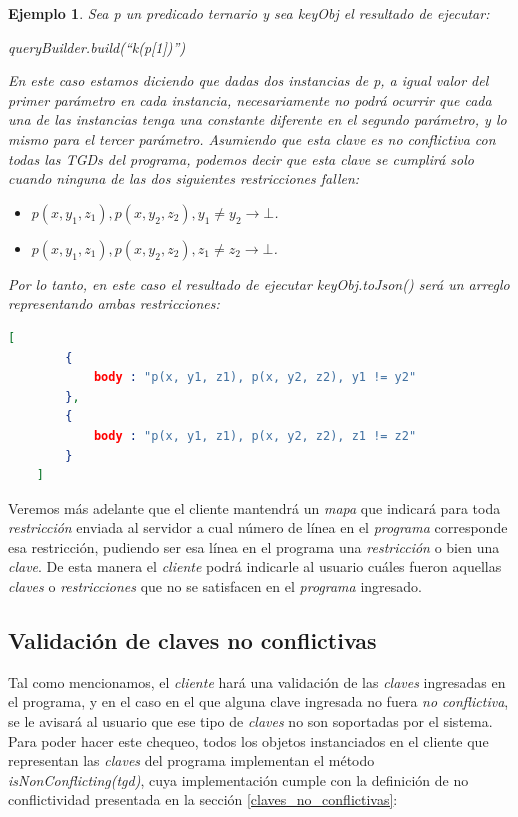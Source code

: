 \documentclass[11pt,a4paper,twoside]{tesis}
\newtheorem{exmp}{Ejemplo}
\begin{document}
\begin{exmp}
Sea \textit{p} un predicado ternario y sea \textit{keyObj} el resultado de ejecutar:

\begin{center}
   \textit{queryBuilder.build(``k(p[1])'')} 
\end{center}

En este caso estamos diciendo que dadas dos instancias de \textit{p}, a igual valor del primer parámetro en cada instancia, necesariamente no podrá ocurrir que cada una de las instancias tenga una constante diferente en el segundo parámetro, y lo mismo para el tercer parámetro. Asumiendo que esta \textit{clave} es no conflictiva con todas las \textit{TGDs} del  \textit{programa}, podemos decir que esta \textit{clave} se cumplirá solo cuando ninguna de las dos siguientes \textit{restricciones} fallen:


\begin{itemize}
    \item \textit{$p(x, y_1, z_1), p(x, y_2, z_2), y_1 \neq y_2 \rightarrow \bot$.}
    \item \textit{$p(x, y_1, z_1), p(x, y_2, z_2), z_1 \neq z_2 \rightarrow  \bot$.}
\end{itemize}

Por lo tanto, en este caso el resultado de ejecutar \textit{keyObj.toJson()} será un arreglo representando ambas \textit{restricciones}:

\begin{lstlisting}[language=json,firstnumber=1]
    [
        {
            body : "p(x, y1, z1), p(x, y2, z2), y1 != y2"
        },
        {
            body : "p(x, y1, z1), p(x, y2, z2), z1 != z2"
        }
    ]    
\end{lstlisting}
\end{exmp}

Veremos más adelante que el cliente mantendrá un \textit{mapa} que indicará para toda \textit{restricción} enviada al servidor a cual número de línea en el \textit{programa} corresponde esa restricción, pudiendo ser esa línea en el programa una \textit{restricción} o bien una \textit{clave}. De esta manera el \textit{cliente} podrá indicarle al usuario cuáles fueron aquellas \textit{claves} o \textit{restricciones} que no se satisfacen en el \textit{programa} ingresado.

\subsection{Validación de claves no conflictivas}
Tal como mencionamos, el \textit{cliente} hará una validación de las \textit{claves} ingresadas en el programa, y en el caso en el que alguna clave ingresada no fuera \textit{no conflictiva}, se le avisará al usuario que ese tipo de \textit{claves} no son soportadas por el sistema. Para poder hacer este chequeo, todos los objetos instanciados en el cliente que representan las \textit{claves} del programa implementan el método \textit{isNonConflicting(tgd)}, cuya implementación cumple con la definición de no conflictividad presentada en la sección \ref{claves_no_conflictivas}: 
\end{document}
